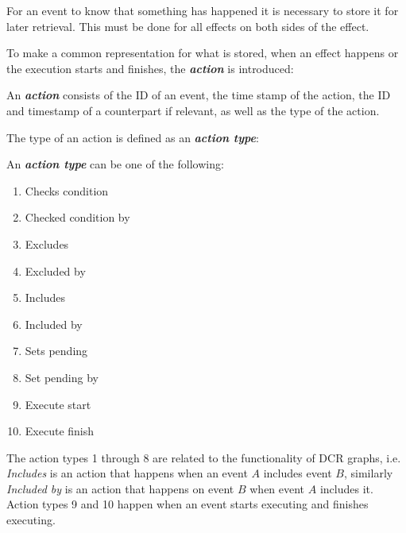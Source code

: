 	\newpar For an event to know that something has happened it is necessary to store it for later retrieval. This must be done for all effects on both sides of the effect.
	
	\newpar To make a common representation for what is stored, when an effect happens or the execution starts and finishes, the \textbf{\textit{action}} is introduced:
	
	\begin{definition}
		An \textit{\textbf{action}} consists of the ID of an event, the time stamp of the action, the ID and timestamp of a counterpart if relevant, as well as the type of the action.
	\end{definition}
	
	\newpar	The type of an action is defined as an \textit{\textbf{action type}}:
	
	\begin{definition}
        \label{def:actiontype}
		An \textit{\textbf{action type}} can be one of the following:
		\begin{multicols}{3}
			\begin{enumerate}
	            \item Checks condition\label{actiontype:checkscondition}
				\item Checked condition by\label{actiontype:checkedconditionby}
				\item Excludes\label{actiontype:excludes}
				\item Excluded by\label{actiontype:excludedby}
				\item Includes\label{actiontype:includes}
				\item Included by\label{actiontype:includedby}
				\item Sets pending\label{actiontype:setspending}
				\item Set pending by\label{actiontype:setpendingby}
				\item Execute start
				\item Execute finish
			\end{enumerate}
		\end{multicols}
	\end{definition}
	
	\newpar The action types 1 through 8 are related to the functionality of DCR graphs, i.e. \textit{Includes} is an action that happens when an event $A$ includes event $B$, similarly \textit{Included by} is an action that happens on event $B$ when event $A$ includes it. Action types 9 and 10 happen when an event starts executing and finishes executing.
    
